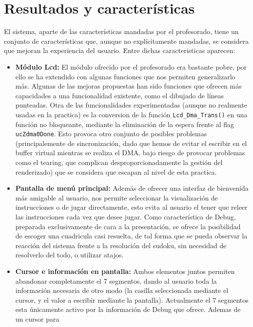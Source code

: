 \documentclass[12pt,letterpaper]{article}
\begin{document}
\section{Resultados y características}
\label{subsec:resultados-caracteristicas}
El sistema, aparte de las características mandadas por el profesorado,
tiene un conjunto de características que, aunque no explícitamente
mandadas, se considera que mejoran la experiencia del usuario. Entre
dichas caracteristicas aparecen:
\begin{itemize}
  \item \textbf{Módulo Lcd:} El módulo ofrecido por el profesorado era
    bastante pobre, por ello se ha extendido con algunas funciones que
    nos permiten generalizarlo más. Algunas de las mejoras propuestas
    han sido funciones que ofrecen más capacidades a una funcionalidad
    existente, como el dibujado de líneas punteadas. Otra de las
    funcionalidades experimentadas (aunque no realmente usadas en la
    practica) es la conversion de la función
    \texttt{Lcd\_Dma\_Trans()} en una función no bloqueante, mediante
    la eliminación de la espera frente al flag
    \texttt{ucZdma0Done}. Esto provoca otro conjunto de posibles
    problemas (principalemente de sincronización, dado que hemos de
    evitar el escribir en el buffer virtual mientras se realiza el
    DMA, bajo riesgo de provocar problemas como el tearing, que
    complican desproporcionadamente la gestión del renderizado) que se
    considera que escapan al nivel de esta practica.
  \item \textbf{Pantalla de menú principal:} Además de ofrecer una
    interfaz de bienvenida más amigable al usuario, nos permite
    seleccionar la visualización de instrucciones o de jugar
    directamente, esto evita al usuario el tener que releer las
    instrucciones cada vez que desee jugar. Como característica de
    Debug, preparada exclusivamente de cara a la presentación, se
    ofrece la posibilidad de escoger una cuadricula casi resuelta, de
    tal forma que se pueda observar la reacción del sistema frente a
    la resolución del sudoku, sin necesidad de resolverlo del todo, o
    utilizar atajos.
  \item \textbf{Cursor e información en pantalla:} Ambos elementos
    juntos permiten abandonar completamente el 7 segmentos, dando al
    usuario toda la información necesaria de otro modo (la casilla
    seleccionada mediante el cursor, y el valor a escribir mediante la
    pantalla). Actualmente el 7 segmentos esta únicamente activo por
    la información de Debug que ofrece. Ademas de un cursor para

\end{itemize}
\end{document}
